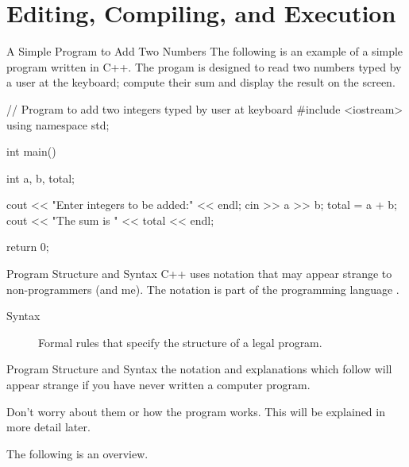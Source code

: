 \documentclass[../lecture1-introduction.tex]{subfiles}
\begin{document}
\section{Editing, Compiling, and Execution}

\begin{frame}[fragile]{A Simple Program to Add Two Numbers}
    The following is an example of a simple program written in C++.
    The progam is designed to read two numbers typed by a user at the keyboard;
    compute their sum and display the result on the screen.
    \begin{cppcode}
        // Program to add two integers typed by user at keyboard
        #include <iostream>
        using namespace std;

        int main()
        {
           int a, b, total;

           cout << "Enter integers to be added:" << endl;
           cin >> a >> b;
           total = a + b;
           cout << "The sum is " << total << endl;

           return 0;
        }
    \end{cppcode}
\end{frame}


\begin{frame}[fragile]{Program Structure and Syntax}
    C++ uses notation that may appear strange to non-programmers (and me).
    The notation is part of the programming language .
    \begin{description}
        \item [Syntax] Formal rules that specify the structure of a legal program.
    \end{description}
\end{frame}

\begin{frame}[fragile]{Program Structure and Syntax}
    the notation and explanations which follow will appear strange if you have
    never written a computer program.

    Don't worry about them or how the program works. This will be explained
    in more detail later.

    The following is an overview.
\end{frame}
\end{document}
